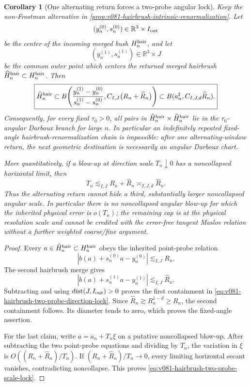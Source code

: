 \documentclass[10pt]{article}
\newtheorem{corollary}[theorem]{Corollary}
\newcommand{\dist}{\operatorname{dist}}
\begin{document}
\begin{corollary}[One alternating return forces a two-probe angular lock]
\label{cor:v081-hairbrush-alternating-two-probe-lock}
Keep the non-Frostman alternative in
\cref{prop:v081-hairbrush-intrinsic-renormalization}.  Let
\[
(y_n^{(0)},s_n^{(0)})\in\mathbb R^3\times I_{\rm out}
\]
be the center of the incoming merged bush \(H_n^{\rm hair}\), and let
\[
(y_n^{(1)},s_n^{(1)})\in\mathbb R^3\times J
\]
be the common outer point which centers the returned merged hairbrush
\(\widehat H_n^{\rm hair}\subset H_n^{\rm hair}\).  Then
\begin{equation}
\label{eq:v081-hairbrush-two-probe-direction-lock}
\boxed{
\widehat H_n^{\rm hair}
\subset
B\!\left(
\frac{y_n^{(1)}-y_n^{(0)}}{s_n^{(1)}-s_n^{(0)}},
C_{I,J}\bigl(R_n+\widehat R_n\bigr)
\right)
\subset
B(a_n^\sharp,C_{I,J,d}\widehat R_n).
}
\end{equation}
Consequently, for every fixed \(\tau_0>0\), all pairs in
\(\widehat H_n^{\rm hair}\times\widehat H_n^{\rm hair}\) lie in the
\(\tau_0\)-angular Darboux branch for large \(n\).  In particular an indefinitely repeated
fixed-angle hairbrush-renormalization chain is impossible: after one alternating-window return,
the next geometric destination is necessarily an angular Darboux chart.

More quantitatively, if a blow-up at direction scale \(T_n\downarrow0\) has a noncollapsed
horizontal limit, then
\begin{equation}
\label{eq:v081-hairbrush-two-probe-scale-lock}
\boxed{
T_n\lesssim_{I,J}R_n+\widehat R_n
\asymp_{I,J,d}\widehat R_n.
}
\end{equation}
Thus the alternating return cannot hide a third, substantially larger noncollapsed angular
scale.  In particular there is no noncollapsed angular blow-up for which the inherited physical
error is \(o(T_n)\); the remaining cap is at the physical resolution scale and cannot be credited
with the error-free tangent Maslov relation without a further weighted coarse/fine argument.
\end{corollary}

\begin{proof}
Every \(a\in\widehat H_n^{\rm hair}\subset H_n^{\rm hair}\) obeys the inherited point-probe
relation
\[
|b(a)+s_n^{(0)}a-y_n^{(0)}|
\lesssim_{I,J}R_n.
\]
The second hairbrush merge gives
\[
|b(a)+s_n^{(1)}a-y_n^{(1)}|
\lesssim_{I,J}\widehat R_n.
\]
Subtracting and using
\(\dist(J,I_{\rm out})>0\) proves the first containment in
\eqref{eq:v081-hairbrush-two-probe-direction-lock}.  Since
\(\widehat R_n\gtrsim R_n^{1-d}\ge R_n\), the second containment follows.  Its diameter tends to
zero, which proves the fixed-angle assertion.

For the last claim, write \(a=a_n+T_n\xi\) on a putative noncollapsed blow-up.  After subtracting
the two point-probe equations and dividing by \(T_n\), the variation in \(\xi\) is
\(O((R_n+\widehat R_n)/T_n)\).  If
\((R_n+\widehat R_n)/T_n\to0\), every limiting horizontal secant vanishes, contradicting
noncollapse.  This proves \eqref{eq:v081-hairbrush-two-probe-scale-lock}.
\end{proof}
\end{document}
